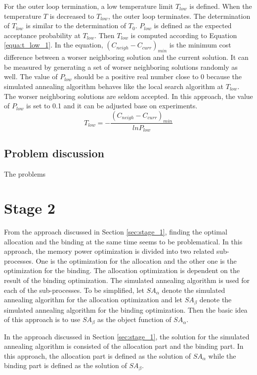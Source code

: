 		For the outer loop termination, a low temperature limit $T_{low}$ is defined.
		When the temperature $T$ is decreased to $T_{low}$, the outer loop terminates.
		The determination of $T_{low}$ is similar to the determination of $T_{0}$.
		$P_{low}$ is defined as the expected acceptance probability at $T_{low}$.
		Then $T_{low}$ is computed according to Equation \ref{equa:t_low_1}.
		In the equation, $\left( C_{neigh}-C_{curr} \right)_{min}$ is the minimum cost
		difference between a worser neighboring solution and the current solution.
		It can be measured by generating a set of worser neighboring solutions randomly
		as well. The value of $P_{low}$ should be a positive real number close to 0
		because the simulated annealing algorithm behaves like the local search algorithm
		at $T_{low}$. The worser neighboring solutions are seldom accepted.
		In this approach, the value of $P_{low}$ is set to 0.1 and it can be adjusted
		base on experiments.
	\begin{equation}
	\label{equa:t_low_1}
		T_{low}= - \frac{\left( C_{neigh}-C_{curr} \right)_{min}}{ln{P_{low}}}
	\end{equation}	
	
	\subsection{Problem discussion}
	\label{subsec:problem_1}
	The problems
	
	\section{Stage 2}
	\label{sec:stage_2}
	From the approach discussed in Section \ref{sec:stage_1}, finding the optimal allocation and
	the binding at the same time seems to be problematical.
	In this approach, the memory power optimization is divided into two related sub-processes.
	One is the optimization for the allocation and the other one is the optimization for the
	binding. The allocation optimization is dependent on the result of the binding optimization.
	The simulated annealing algorithm is used for each of the sub-processes.
	To be simplified, let $SA_{\alpha}$ denote the simulated annealing algorithm for the
	allocation optimization and let $SA_{\beta}$ denote the simulated annealing algorithm
	for the binding optimization. Then the basic idea of this approach is to use $SA_{\beta}$
	as the object function of $SA_{\alpha}$.
	
	In the approach discussed in Section \ref{sec:stage_1}, the solution for the simulated annealing
	algorithm is consisted of the allocation part and the binding part. In this approach, the
	allocation part is defined as the solution of $SA_{\alpha}$ while the binding part is defined
	as the solution of $SA_{\beta}$.
	
